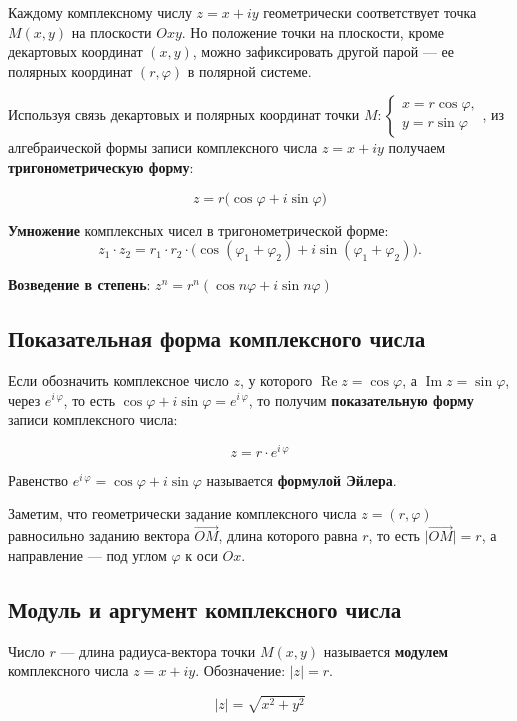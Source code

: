 Каждому комплексному числу $z = x + iy$ геометрически соответствует точка $M(x,y)$ на плоскости $Oxy$. Но положение точки на плоскости, кроме декартовых координат $(x,y)$, можно зафиксировать другой парой — ее полярных координат $(r,\varphi)$ в полярной системе.

Используя связь декартовых и полярных координат точки $M\colon \begin{cases} x=r\cos\varphi,\\ y=r\sin\varphi\end{cases}$, из алгебраической формы записи комплексного числа $z=x+iy$ получаем \textbf{тригонометрическую форму}:

$$z=r \bigl(\cos\varphi+i\sin\varphi\bigr)$$

\textbf{Умножение} комплексных чисел в тригонометрической форме:
$$z_1\cdot z_2= r_1\cdot r_2\cdot \bigl(\cos(\varphi_1+\varphi_2)+ i\sin(\varphi_1+ \varphi_2)\bigr).$$

\textbf{Возведение в степень}: $z^n= r^n(\cos n\varphi+ i\sin n\varphi)$

\subsection{Показательная форма комплексного числа}

Если обозначить комплексное число $z$, у которого $\operatorname{Re}z= \cos\varphi$, а $\operatorname{Im}z=\sin\varphi$, через $e^{i\,\varphi}$, то есть $\cos\varphi+i\sin\varphi=e^{i\,\varphi}$, то получим \textbf{показательную форму} записи комплексного числа:

$$z=r\cdot e^{i\,\varphi}$$

Равенство $e^{i\,\varphi}= \cos\varphi+i\sin\varphi$ называется \textbf{формулой Эйлера}.

Заметим, что геометрически задание комплексного числа $z=(r,\varphi)$ равносильно заданию вектора $\overrightarrow{OM}$, длина которого равна $r$, то есть $\bigl|\overrightarrow{OM}\bigr|=r$, а направление — под углом $\varphi$ к оси $Ox$.

\subsection{Модуль и аргумент комплексного числа}

Число $r$ — длина радиуса-вектора точки $M(x,y)$ называется \textbf{модулем} комплексного числа $z=x+iy$. Обозначение: $|z| = r$.

$$|z|=\sqrt{x^2+y^2}$$

